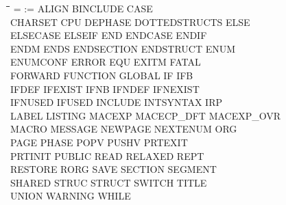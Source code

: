 {\tt\begin{tabbing}
\hspace{3cm}\=\hspace{3cm}\=\hspace{3cm}\=\hspace{3cm}\=\kill
=          \> :=          \> ALIGN       \> BINCLUDE    \> CASE \\
CHARSET    \> CPU         \> DEPHASE     \> DOTTEDSTRUCTS\> ELSE \\
ELSECASE   \> ELSEIF      \> END         \> ENDCASE     \> ENDIF \\
ENDM       \> ENDS        \> ENDSECTION  \> ENDSTRUCT   \> ENUM \\
ENUMCONF   \> ERROR       \> EQU         \> EXITM       \> FATAL \\
FORWARD    \> FUNCTION    \> GLOBAL      \> IF          \> IFB \\
IFDEF      \> IFEXIST     \> IFNB        \> IFNDEF      \> IFNEXIST \\
IFNUSED    \> IFUSED      \> INCLUDE     \> INTSYNTAX   \> IRP \\
LABEL      \> LISTING     \> MACEXP      \> MACECP\_DFT \> MACEXP\_OVR \\
MACRO      \> MESSAGE     \> NEWPAGE     \> NEXTENUM    \> ORG \\
PAGE       \> PHASE       \> POPV        \> PUSHV       \> PRTEXIT \\
PRTINIT    \> PUBLIC      \> READ        \> RELAXED     \> REPT \\
RESTORE    \> RORG        \> SAVE        \> SECTION     \> SEGMENT \\
SHARED     \> STRUC       \> STRUCT      \> SWITCH      \> TITLE \\
UNION      \> WARNING     \> WHILE \\
\end{tabbing}}
